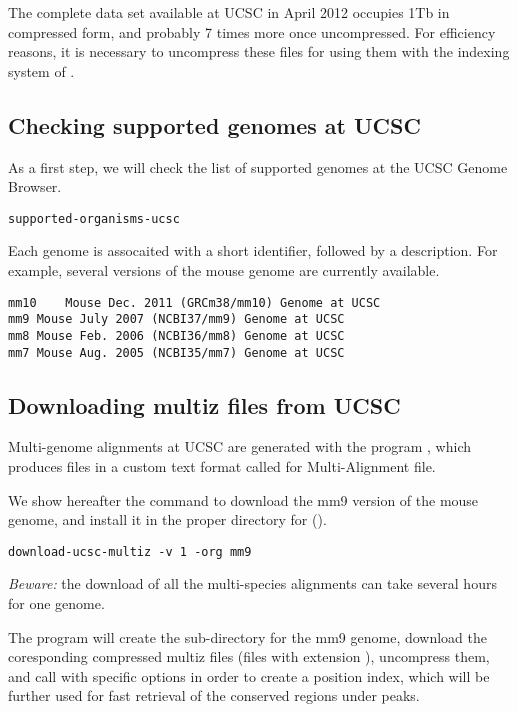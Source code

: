 The complete data set available at UCSC in April 2012 occupies 1Tb in
compressed form, and probably 7 times more once uncompressed. For
efficiency reasons, it is necessary to uncompress these files for
using them with the indexing system of .

\subsection{Checking supported genomes at UCSC}

As a first step, we will check the list of supported genomes at the
UCSC Genome Browser.

\begin{lstlisting}
supported-organisms-ucsc
\end{lstlisting}

Each genome is assocaited with a short identifier, followed by a
description. For example, several versions of the mouse genome are
currently available.

\begin{small}
\begin{verbatim}
mm10	Mouse Dec. 2011 (GRCm38/mm10) Genome at UCSC
mm9	Mouse July 2007 (NCBI37/mm9) Genome at UCSC
mm8	Mouse Feb. 2006 (NCBI36/mm8) Genome at UCSC
mm7	Mouse Aug. 2005 (NCBI35/mm7) Genome at UCSC
\end{verbatim}
\end{small}

\subsection{Downloading multiz files from UCSC}

Multi-genome alignments at UCSC are generated with the program
, which produces files in a custom text format called
 for Multi-Alignment file.

We show hereafter the command to download the mm9 version of the mouse
genome, and install it in the proper directory for
 ().

\begin{lstlisting}
download-ucsc-multiz -v 1 -org mm9
\end{lstlisting}

\emph{Beware: } the download of all the multi-species alignments can
take several hours for one genome.

The program will create the sub-directory for the mm9 genome, download
the coresponding compressed multiz files (files with extension
), uncompress them, and call 
with specific options in order to create a position index, which will
be further used for fast retrieval of the conserved regions under
peaks.


